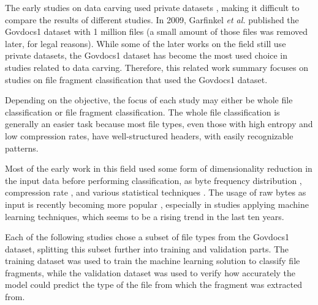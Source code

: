 The early studies on data carving used private datasets
\cite{karresand_file_2006} \cite{veenman_statistical_2007} \cite{erbacher_identification_2007} \cite{moody_sadi-statistical_2008} \cite{calhoun_predicting_2008} \cite{li_novel_2010} \cite{conti_automated_2010} \cite{kattan_gp-fileprints:_2010},
making it difficult to compare the results of different studies. In 2009, Garfinkel \textit{et al.} \cite{garfinkel_bringing_2009} published the Govdocs1 dataset with 1 million files (a small amount of those files was removed later, for legal reasons). While some of the later works on the field still use private datasets, the Govdocs1 dataset has become the most used choice in studies related to data carving. Therefore, this related work summary focuses on studies on file fragment classification that used the Govdocs1 dataset.

Depending on the objective, the focus of each study may either be whole file classification or file fragment classification. The whole file classification is generally an easier task because most file types, even those with high entropy and low compression rates, have well-structured headers, with easily recognizable patterns.

Most of the early work in this field used some form of dimensionality reduction in the input data before performing classification, as byte frequency distribution 
\cite{karresand_oscarfile_2006} \cite{harris_using_2007} \cite{amirani_new_2008} \cite{ahmed_content-based_2010} \cite{ahmed_fast_2010} \cite{sportiello_context-based_2012} \cite{amirani_feature-based_2013} \cite{qiu_new_2014} \cite{maslim_distributed_2014} \cite{ali_classification_2018}, compression rate \cite{axelsson_normalised_2010} \cite{penrose_approaches_2013}, and various statistical techniques \cite{veenman_statistical_2007} \cite{erbacher_identification_2007} \cite{moody_sadi-statistical_2008} \cite{calhoun_predicting_2008} \cite{li_novel_2010} \cite{kattan_gp-fileprints:_2010} \cite{gopal_statistical_2011}. The usage of raw bytes as input is recently becoming more popular \cite{hiester_file_2018} \cite{chen_file_2018} \cite{wang_sparse_2018} \cite{wang_file_2018} \cite{vulinovic_neural_2019},
especially in studies applying machine learning techniques, which seems to be a rising trend in the last ten years.

Each of the following studies chose a subset of file types from the Govdocs1 dataset, splitting this subset further into training and validation parts. The training dataset was used to train the machine learning solution to classify file fragments, while the validation dataset was used to verify how accurately the model could predict the type of the file from which the fragment was extracted from.

